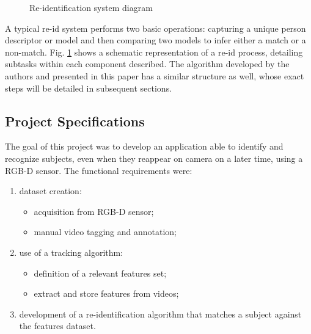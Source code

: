 \documentclass[letterpaper, 11pt, conference]{ieeeconf} %
\begin{document}
\begin{figure}[t]
\centering
\caption{Re-identification system diagram} \label{f1}
\end{figure}

A typical re-id system performs two basic operations: capturing a unique person descriptor or model and then comparing two models to infer either a match or a non-match. Fig. \ref{f1} shows a schematic representation of a re-id process, detailing subtasks within each component described. The algorithm developed by the authors and presented in this paper has a similar structure as well, whose exact steps will be detailed in subsequent sections.

\subsection*{Project Specifications}
The goal of this project was to develop an application able to identify and recognize subjects, even when they reappear on camera on a later time, using a RGB-D sensor. The functional requirements were:

\begin{enumerate}
\item{dataset creation:}
	\begin{itemize}
	\item{acquisition from RGB-D sensor;}
	\item{manual video tagging and annotation;}
	\end{itemize}
\item{use of a tracking algorithm:}
	\begin{itemize}
	\item{definition of a relevant features set;}
	\item{extract and store features from videos;}
	\end{itemize}
\item{development of a re-identification algorithm that matches a subject against the features dataset.}
\end{enumerate}
\end{document}
